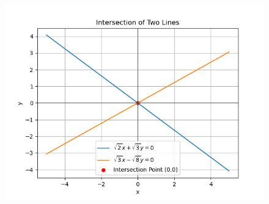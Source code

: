\documentclass[journal]{IEEEtran}
\begin{document}
 \begin{figure}[H]
     \centering
     \includegraphics[width=0.8\columnwidth]{figs/10.png}
     \label{fig:1}
 \end{figure}
\end{document}
